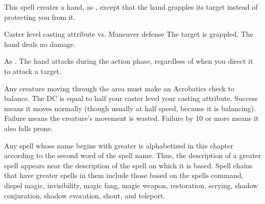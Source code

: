 \begin{spellheader}
    \spellrng{\rngmed}
    \spelldur{\durshort \dismissable}
\end{spellheader}
\begin{spelleffects}
    \spelleffect This spell creates a hand, as , except that the hand grapples its target instead of protecting you from it.
    \begin{spellattack}{Caster level \add casting attribute vs. Maneuver defense}
        \spellsuccess The target is grappled. The hand deals no damage.
    \end{spellattack}
\end{spelleffects}
\begin{spellfooter}
    \spellnotes As . The hand attacks during the action phase, regardless of when you direct it to attack a target.
\end{spellfooter}

\begin{spellheader}
    \spelldur{\durshort \dismissable}
\end{spellheader}
\begin{spelleffects}
    \spelleffect Any creature moving through the area must make an Acrobatics check to balance. The DC is equal to half your caster level \add your casting attribute. Success means it moves normally (though usually at half speed, because it is balancing). Failure means the creature's movement is wasted. Failure by 10 or more means it also falls prone.

    \par Any spell whose name begins with greater is alphabetized in this chapter according to the second word of the spell name. Thus, the description of a greater spell appears near the description of the spell on which it is based. Spell chains that have greater spells in them include those based on the spells command, dispel magic, invisibility, magic fang, magic weapon, restoration, scrying, shadow conjuration, shadow evocation, shout, and teleport.
\end{spelleffects}
\begin{spellfooter}

\end{spellfooter}

